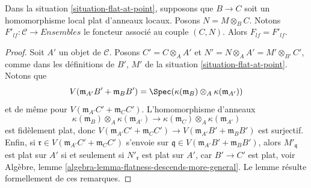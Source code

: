 \begin{lemma}
\label{lemma-flat-at-point-go-up}
Dans la
situation \ref{situation-flat-at-point},
supposons que $B \to C$ soit un homomorphisme local plat d'anneaux
locaux. Posons $N = M \otimes_B C$. Notons
$F'_{lf} : \mathcal{C} \to \textit{Ensembles}$ le foncteur associé
au couple $(C, N)$. Alors $F_{lf} = F'_{lf}$.
\end{lemma}

\begin{proof}
Soit $A'$ un objet de $\mathcal{C}$. Posons $C' = C \otimes_A A'$
et $N' = N \otimes_A A' = M' \otimes_{B'} C'$, comme dans les définitions
de $B'$, $M'$ de la
situation \ref{situation-flat-at-point}. Notons que
$$
V(\mathfrak m_{A'}B' + \mathfrak m_B B')
=
\Spec( \kappa(\mathfrak m_B) \otimes_A \kappa(\mathfrak m_{A'}) )
$$
et de même pour $V(\mathfrak m_{A'}C' + \mathfrak m_C C')$.
L'homomorphisme d'anneaux
$$
\kappa(\mathfrak m_B) \otimes_A \kappa(\mathfrak m_{A'})
\longrightarrow
\kappa(\mathfrak m_C) \otimes_A \kappa(\mathfrak m_{A'})
$$
est fidèlement plat, donc
$V(\mathfrak m_{A'}C' + \mathfrak m_C C') \to
V(\mathfrak m_{A'}B' + \mathfrak m_B B')$ est surjectif.
Enfin, si $\mathfrak r \in V(\mathfrak m_{A'}C' + \mathfrak m_C C')$
s'envoie sur $\mathfrak q \in V(\mathfrak m_{A'}B' + \mathfrak m_B B')$, alors
$M'_{\mathfrak q}$ est plat sur $A'$ si et seulement si
$N'_{\mathfrak r}$ est plat sur $A'$, car $B' \to C'$ est plat, voir
Algèbre, lemme \ref{algebra-lemma-flatness-descends-more-general}.
Le lemme résulte formellement de ces remarques.
\end{proof}

